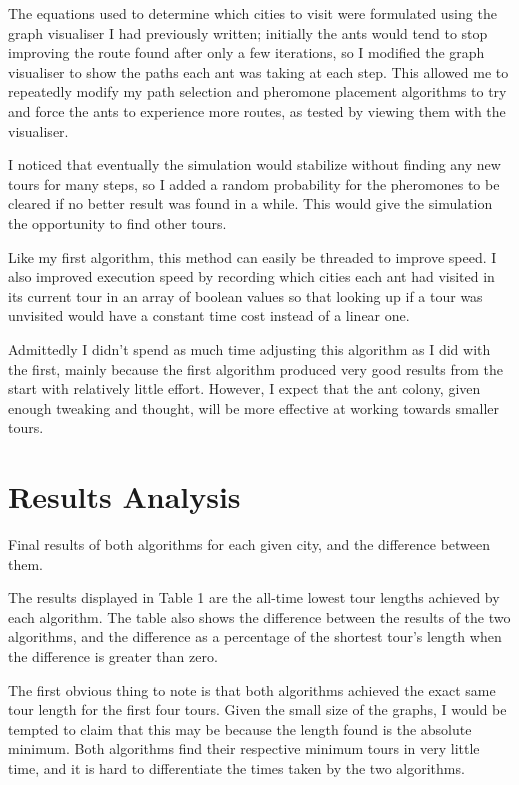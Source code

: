 \documentclass[a4paper,11pt]{article}
\begin{document}
The equations used to determine which cities to visit were formulated using the
graph visualiser I had previously written; initially the ants would tend to
stop improving the route found after only a few iterations, so I modified the
graph visualiser to show the paths each ant was taking at each step. This
allowed me to repeatedly modify my path selection and pheromone placement
algorithms to try and force the ants to experience more routes, as tested by 
viewing them with the visualiser.

I noticed that eventually the simulation would stabilize without finding any
new tours for many steps, so I added a random probability for the pheromones
to be cleared if no better result was found in a while. This would give the
simulation the opportunity to find other tours.

Like my first algorithm, this method can easily be threaded to improve speed.
I also improved execution speed by recording which cities each ant had visited
in its current tour in an array of boolean values so that looking up if a tour
was unvisited would have a constant time cost instead of a linear one.

Admittedly I didn't spend as much time adjusting this algorithm as I did with
the first, mainly because the first algorithm produced very good results from
the start with relatively little effort. However, I expect that the ant colony,
given enough tweaking and thought, will be more effective at working towards
smaller tours.

\section{Results Analysis}
\begin{table}
\begin{center}

\caption{Final results of both algorithms for each given city, and the
	difference between them.}
\end{center}
\end{table}

The results displayed in Table 1 are the all-time lowest tour lengths
achieved by each algorithm. The table also shows the difference between the
results of the two algorithms, and the difference as a percentage of the
shortest tour's length when the difference is greater than zero.

The first obvious thing to note is that both algorithms achieved the exact same
tour length for the first four tours. Given the small size of the graphs,
I would be tempted to claim that this may be because the length found is the
absolute minimum. Both algorithms find their respective minimum tours in very
little time, and it is hard to differentiate the times taken by the two
algorithms.
\end{document}
